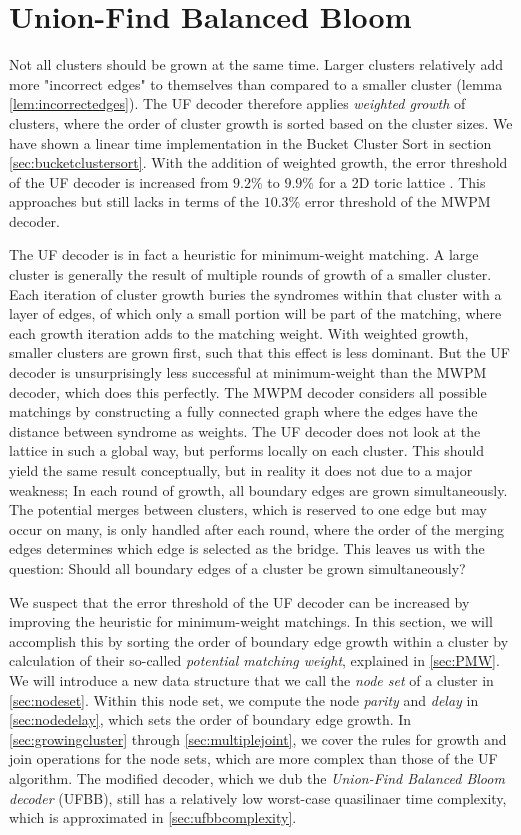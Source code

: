 \section{Union-Find Balanced Bloom}

Not all clusters should be grown at the same time. Larger clusters relatively add more "incorrect edges" to themselves than compared to a smaller cluster (lemma \ref{lem:incorrectedges}). The UF decoder therefore applies \emph{weighted growth} of clusters, where the order of cluster growth is sorted based on the cluster sizes. We have shown a linear time implementation in the Bucket Cluster Sort in section \ref{sec:bucketclustersort}. With the addition of weighted growth, the error threshold of the UF decoder is increased from $9.2\%$ to $9.9\%$ for a 2D toric lattice \cite{delfosse2017almost}. This approaches but still lacks in terms of the $10.3\%$ error threshold of the MWPM decoder.

The UF decoder is in fact a heuristic for minimum-weight matching. A large cluster is generally the result of multiple rounds of growth of a smaller cluster. Each iteration of cluster growth buries the syndromes within that cluster with a layer of edges, of which only a small portion will be part of the matching, where each growth iteration adds to the matching weight. With weighted growth, smaller clusters are grown first, such that this effect is less dominant. But the UF decoder is unsurprisingly less successful at minimum-weight than the MWPM decoder, which does this perfectly. The MWPM decoder considers all possible matchings by constructing a fully connected graph where the edges have the distance between syndrome as weights. The UF decoder does not look at the lattice in such a global way, but performs locally on each cluster. This should yield the same result conceptually, but in reality it does not due to a major weakness; In each round of growth, all boundary edges are grown simultaneously. The potential merges between clusters, which is reserved to one edge but may occur on many, is only handled after each round, where the order of the merging edges determines which edge is selected as the bridge. This leaves us with the question: Should all boundary edges of a cluster be grown simultaneously?

We suspect that the error threshold of the UF decoder can be increased by improving the heuristic for minimum-weight matchings. In this section, we will accomplish this by sorting the order of boundary edge growth within a cluster by calculation of their so-called \emph{potential matching weight}, explained in \ref{sec:PMW}. We will introduce a new data structure that we call the \emph{node set} of a cluster in \ref{sec:nodeset}. Within this node set, we compute the node \emph{parity} and \emph{delay} in \ref{sec:nodedelay}, which sets the order of boundary edge growth. In \ref{sec:growingcluster} through \ref{sec:multiplejoint}, we cover the rules for growth and join operations for the node sets, which are more complex than those of the UF algorithm. The modified decoder, which we dub the \emph{Union-Find Balanced Bloom decoder} (UFBB), still has a relatively low worst-case quasilinaer time complexity, which is approximated in \ref{sec:ufbbcomplexity}.


